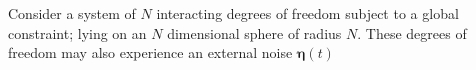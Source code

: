 Consider a system of $N$ interacting degrees of freedom subject to a global constraint; lying on an $N$ dimensional sphere of radius $N$. These degrees of freedom may also experience an external noise $\mathbf{\eta}(t)$